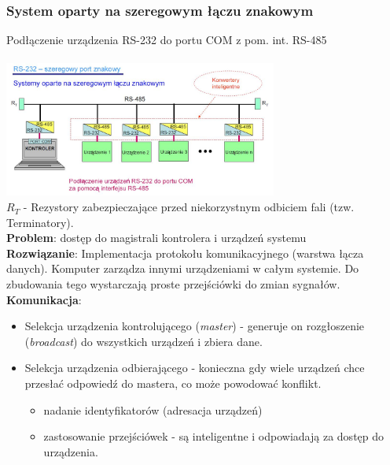 		\subsubsection{System oparty na szeregowym łączu znakowym}
		Podłączenie urządzenia RS-232 do portu COM z pom. int. RS-485\\\\
		\includegraphics[width=9cm]{./wyklady/RS232_14_1.jpg}\\
		$ R_T $ - Rezystory zabezpieczające przed niekorzystnym odbiciem fali (tzw. Terminatory).\\
		\textbf{Problem}: dostęp do magistrali kontrolera i urządzeń systemu\\
		\textbf{Rozwiązanie}: Implementacja protokołu komunikacyjnego (warstwa łącza danych). Komputer zarządza innymi urządzeniami w całym systemie. Do zbudowania tego wystarczają proste przejściówki do zmian sygnałów.\\
		\textbf{Komunikacja}:
		\begin{itemize}
			\item Selekcja urządzenia kontrolującego (\emph{master}) - generuje on rozgłoszenie (\emph{broadcast}) do wszystkich urządzeń i zbiera dane.
			\item Selekcja urządzenia odbierającego - konieczna gdy wiele urządzeń chce przesłać odpowiedź do mastera, co może powodować konflikt.
			\begin{itemize}
				\item nadanie identyfikatorów (adresacja urządzeń)
				\item zastosowanie przejściówek - są inteligentne i odpowiadają za dostęp do urządzenia.
			\end{itemize}
		\end{itemize}
